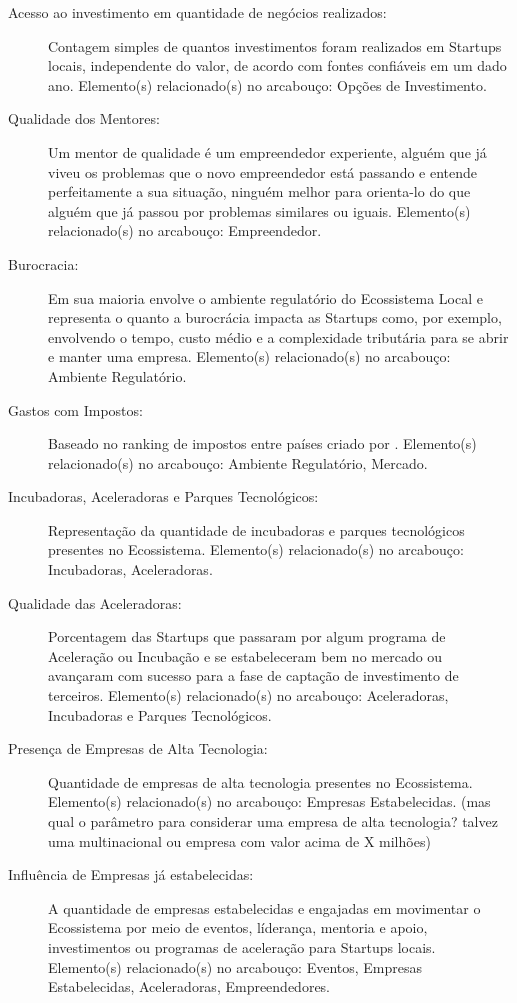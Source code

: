 \begin{description}
  \item [Acesso ao investimento em quantidade de negócios realizados:] Contagem simples de quantos investimentos foram realizados em Startups locais, independente do valor, de acordo com fontes confiáveis em um dado ano. Elemento(s) relacionado(s) no arcabouço: Opções de Investimento.

  \item [Qualidade dos Mentores:] Um mentor de qualidade é um empreendedor experiente, alguém que já viveu os problemas que o novo empreendedor está passando e entende perfeitamente a sua situação, ninguém melhor para orienta-lo do que alguém que já passou por problemas similares ou iguais. Elemento(s) relacionado(s) no arcabouço: Empreendedor.

  \item [Burocracia:] Em sua maioria envolve o ambiente regulatório do Ecossistema Local e representa o quanto a burocrácia impacta as Startups como, por exemplo, envolvendo o tempo, custo médio e a complexidade tributária para se abrir e manter uma empresa. Elemento(s) relacionado(s) no arcabouço: Ambiente Regulatório.

  \item [Gastos com Impostos:] Baseado no ranking de impostos entre países criado por . Elemento(s) relacionado(s) no arcabouço: Ambiente Regulatório, Mercado. 

  \item [Incubadoras, Aceleradoras e Parques Tecnológicos:] Representação da quantidade de incubadoras e parques tecnológicos presentes no Ecossistema. Elemento(s) relacionado(s) no arcabouço: Incubadoras, Aceleradoras.

  \item [Qualidade das Aceleradoras:] Porcentagem das Startups que passaram por algum programa de Aceleração ou Incubação e se estabeleceram bem no mercado ou avançaram com sucesso para a fase de captação de investimento de terceiros. Elemento(s) relacionado(s) no arcabouço: Aceleradoras, Incubadoras e Parques Tecnológicos.

  \item [Presença de Empresas de Alta Tecnologia:] Quantidade de empresas de alta tecnologia presentes no Ecossistema. Elemento(s) relacionado(s) no arcabouço: Empresas Estabelecidas. (mas qual o parâmetro para considerar uma empresa de alta tecnologia? talvez uma multinacional ou empresa com valor acima de X milhões)

  \item [Influência de Empresas já estabelecidas:] A quantidade de empresas estabelecidas e engajadas em movimentar o Ecossistema por meio de eventos, líderança, mentoria e apoio, investimentos ou programas de aceleração para Startups locais. Elemento(s) relacionado(s) no arcabouço: Eventos, Empresas Estabelecidas, Aceleradoras, Empreendedores.


\end{description}
